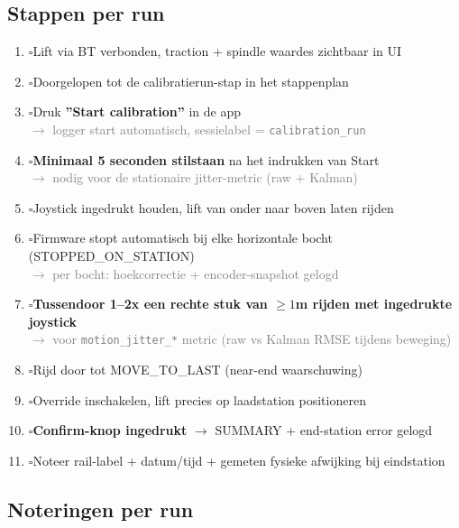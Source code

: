 \documentclass[a4paper,11pt]{article}
\newcommand{\cbox}{$\square$\hspace{0.5em}}
\begin{document}
\subsection*{Stappen per run}
\begin{enumerate}[leftmargin=2em]
    \item \cbox Lift via BT verbonden, traction + spindle waardes zichtbaar in UI
    \item \cbox Doorgelopen tot de calibratierun-stap in het stappenplan
    \item \cbox Druk \textbf{''Start calibration''} in de app\\
        \textcolor{gray}{\small $\rightarrow$ logger start automatisch, sessielabel = \texttt{calibration\_run}}
    \item \cbox \textbf{Minimaal 5 seconden stilstaan} na het indrukken van Start\\
        \textcolor{gray}{\small $\rightarrow$ nodig voor de stationaire jitter-metric (raw + Kalman)}
    \item \cbox Joystick ingedrukt houden, lift van onder naar boven laten rijden
    \item \cbox Firmware stopt automatisch bij elke horizontale bocht (STOPPED\_ON\_STATION)\\
        \textcolor{gray}{\small $\rightarrow$ per bocht: hoekcorrectie + encoder-snapshot gelogd}
    \item \cbox \textbf{Tussendoor 1--2x een rechte stuk van $\geq 1$m rijden met ingedrukte joystick}\\
        \textcolor{gray}{\small $\rightarrow$ voor \texttt{motion\_jitter\_*} metric (raw vs Kalman RMSE tijdens beweging)}
    \item \cbox Rijd door tot MOVE\_TO\_LAST (near-end waarschuwing)
    \item \cbox Override inschakelen, lift precies op laadstation positioneren
    \item \cbox \textbf{Confirm-knop ingedrukt} $\rightarrow$ SUMMARY + end-station error gelogd
    \item \cbox Noteer rail-label + datum/tijd + gemeten fysieke afwijking bij eindstation
\end{enumerate}

\subsection*{Noteringen per run}
\vspace{0.3em}
\end{document}

